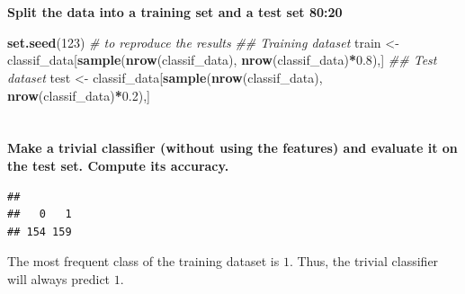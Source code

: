 \documentclass[
  12pt,
  oneside]{report}
\newenvironment{Shaded}{\begin{snugshade}}{\end{snugshade}}
\newcommand{\CommentTok}[1]{\textcolor[rgb]{0.56,0.35,0.01}{\textit{#1}}}
\newcommand{\DecValTok}[1]{\textcolor[rgb]{0.00,0.00,0.81}{#1}}
\newcommand{\FloatTok}[1]{\textcolor[rgb]{0.00,0.00,0.81}{#1}}
\newcommand{\KeywordTok}[1]{\textcolor[rgb]{0.13,0.29,0.53}{\textbf{#1}}}
\newcommand{\NormalTok}[1]{#1}
\newcommand{\OperatorTok}[1]{\textcolor[rgb]{0.81,0.36,0.00}{\textbf{#1}}}
\newcommand{\StringTok}[1]{\textcolor[rgb]{0.31,0.60,0.02}{#1}}
\begin{document}
\hypertarget{section-3}{%
\section{}\label{section-3}}

\textbf{Split the data into a training set and a test set 80:20}

\begin{Shaded}
\begin{Highlighting}[]
\KeywordTok{set.seed}\NormalTok{(}\DecValTok{123}\NormalTok{) }\CommentTok{\# to reproduce the results}
\CommentTok{\#\# Training dataset}
\NormalTok{train \textless{}{-}}\StringTok{ }\NormalTok{classif\_data[}\KeywordTok{sample}\NormalTok{(}\KeywordTok{nrow}\NormalTok{(classif\_data), }\KeywordTok{nrow}\NormalTok{(classif\_data)}\OperatorTok{*}\FloatTok{0.8}\NormalTok{),]}
\CommentTok{\#\# Test dataset}
\NormalTok{test \textless{}{-}}\StringTok{ }\NormalTok{classif\_data[}\KeywordTok{sample}\NormalTok{(}\KeywordTok{nrow}\NormalTok{(classif\_data), }\KeywordTok{nrow}\NormalTok{(classif\_data)}\OperatorTok{*}\FloatTok{0.2}\NormalTok{),]}
\end{Highlighting}
\end{Shaded}

\hypertarget{section-4}{%
\section{}\label{section-4}}

\textbf{Make a trivial classifier (without using the features) and evaluate it on the test set. Compute its accuracy.}

\begin{Shaded}
\end{Shaded}

\begin{verbatim}
## 
##   0   1 
## 154 159
\end{verbatim}

The most frequent class of the training dataset is \(1\). Thus, the trivial classifier will always predict \(1\).

\begin{Shaded}
\end{Shaded}
\end{document}
